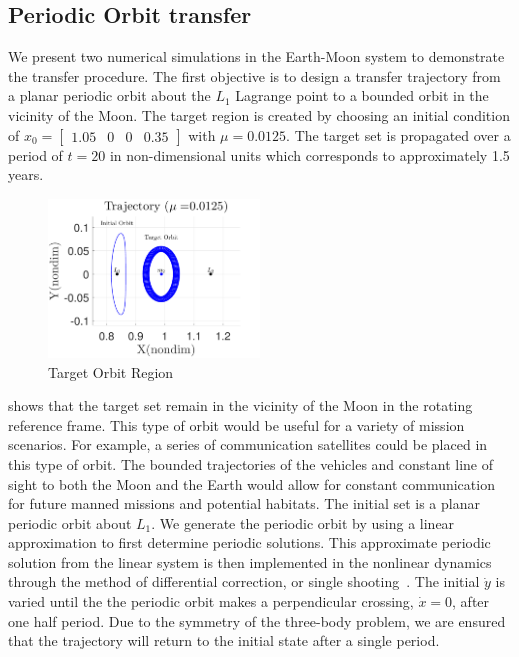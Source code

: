 \documentclass[preprint]{elsarticle}
\begin{document}
\subsection{Periodic Orbit transfer}\label{sec:periodic_orbit_transfer}
We present two numerical simulations in the Earth-Moon system to demonstrate the transfer procedure.
The first objective is to design a transfer trajectory from a planar periodic orbit about the \( L_1\) Lagrange point to a bounded orbit in the vicinity of the Moon.
The target region is created by choosing an initial condition of \( x_0 = \begin{bmatrix}1.05 & 0 & 0 & 0.35 \end{bmatrix} \) with \( \mu = 0.0125 \).
The target set is propagated over a period of \( t = \num{20} \) in non-dimensional units which corresponds to approximately \num{1.5} years.
\begin{figure}[htbp]
   \centering
   \includegraphics[width=0.5\textwidth]{moon_orbit} %
   \caption{Target Orbit Region}
   \label{fig:moon_orbit}
\end{figure}
 shows that the target set remain in the vicinity of the Moon in the rotating reference frame. 
This type of orbit would be useful for a variety of mission scenarios.
For example, a series of communication satellites could be placed in this type of orbit. 
The bounded trajectories of the vehicles and constant line of sight to both the Moon and the Earth would allow for constant communication for future manned missions and potential habitats.
The initial set is a planar periodic orbit about \( L_1\).
We generate the periodic orbit by using a linear approximation to first determine periodic solutions.
This approximate periodic solution from the linear system is then implemented in the nonlinear dynamics through the method of differential correction, or single shooting~\cite{koon2011}.
The initial \( \dot{y} \) is varied until the the periodic orbit makes a perpendicular crossing, \( \dot{x} = 0 \), after one half period.
Due to the symmetry of the three-body problem, we are ensured that the trajectory will return to the initial state after a single period. 
\end{document}

